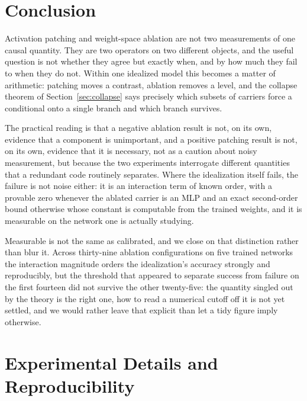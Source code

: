 \documentclass[11pt,a4paper]{article}
\begin{document}
\section{Conclusion}
\label{sec:conclusion}

Activation patching and weight-space ablation are not two measurements of one
causal quantity. They are two operators on two different objects, and the
useful question is not whether they agree but exactly when, and by how much
they fail to when they do not. Within one idealized model this becomes a
matter of arithmetic: patching moves a contrast, ablation removes a level,
and the collapse theorem of Section~\ref{sec:collapse} says precisely which
subsets of carriers force a conditional onto a single branch and which branch
survives.

The practical reading is that a negative ablation result is not, on its own,
evidence that a component is unimportant, and a positive patching result is
not, on its own, evidence that it is necessary, not as a caution about
noisy measurement, but because the two experiments interrogate different
quantities that a redundant code routinely separates. Where the idealization
itself fails, the failure is not noise either: it is an interaction term of
known order, with a provable zero whenever the ablated carrier is an MLP and
an exact second-order bound otherwise whose constant is computable from the
trained weights, and it is measurable on the network one is actually studying.

Measurable is not the same as calibrated, and we close on that distinction
rather than blur it. Across thirty-nine ablation configurations on five
trained networks the interaction magnitude orders the idealization's
accuracy strongly and reproducibly, but the threshold that appeared to
separate success from failure on the first fourteen did not survive the
other twenty-five: the quantity singled out by the theory is the right one,
how to read a numerical cutoff off it is not yet settled, and we would rather
leave that explicit than let a tidy figure imply otherwise.

\appendix

\section{Experimental Details and Reproducibility}
\label{app:repro}
\end{document}
